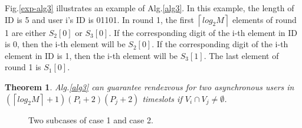\documentclass[10pt, conference, letterpaper]{IEEEtran}
\newtheorem{theorem}{Theorem}
\begin{document}
Fig.\ref{exp-alg3} illustrates an example of Alg.\ref{alg3}. In this example, the length of ID is 5 and user i's ID is 01101. In round 1, the first $ \left \lceil log_2M \right \rceil$ elements of round 1 are either $S_2[0]$ or $S_3[0]$. If the corresponding digit of the i-th element in ID is 0, then the i-th element will be $S_2[0]$. If the corresponding digit of the i-th element in ID is 1, then the i-th element will be $S_3[1]$. The last element of round 1 is $S_1[0]$.

\begin{theorem}
Alg.\ref{alg3} can guarantee rendezvous for two asynchronous users in $(\left \lceil log_2M \right \rceil + 1)(P_i + 2)(P_j + 2)$ timeslots if $V_i \cap V_j \ne \emptyset$.
\end{theorem}



\begin{figure}
\centering
{}
\caption{Two subcases of case 1 and case 2.}
\label{case}
\end{figure}
\end{document}
